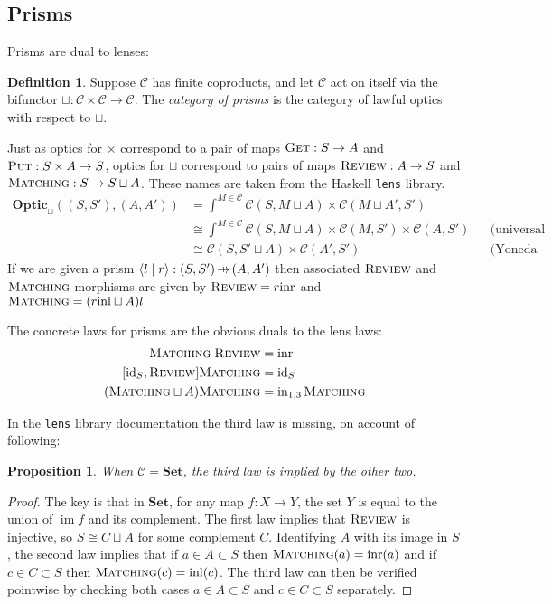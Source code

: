 \documentclass[11pt,letterpaper]{article}
\theoremstyle{plain}
\newtheorem{proposition}[theorem]{Proposition}
\theoremstyle{definition}
\newtheorem{definition}[theorem]{Definition}
\newcommand{\C}{\mathscr{C}}
\newcommand{\lenslib}{\texttt{lens}}
\newcommand{\Set}{\mathbf{Set}}
\newcommand{\Optic}{\mathbf{Optic}}
\newcommand{\id}{\mathrm{id}}
\newcommand{\inl}{\mathrm{inl}}
\newcommand{\inr}{\mathrm{inr}}
\DeclareMathOperator{\im}{im}
\newcommand{\rep}[2]{{\ensuremath \left\langle #1 \mid #2 \right\rangle}}
\newcommand{\fget}{\textsc{Get}}
\newcommand{\fput}{\textsc{Put}}
\newcommand{\freview}{\textsc{Review}}
\newcommand{\fmatching}{\textsc{Matching}}
\newcommand{\hto}{\ensuremath{\,\mathaccent\shortmid\rightarrow\,}}
\begin{document}
\subsection{Prisms}
Prisms are dual to lenses:

\begin{definition}
  Suppose $\C$ has finite coproducts, and let $\C$ act on itself via the bifunctor $\sqcup : \C \times \C \to \C$. The \emph{category of prisms} is the category of lawful optics with respect to $\sqcup$.
\end{definition}

Just as optics for $\times$ correspond to a pair of maps $\fget : S \to A$ and $\fput : S \times A \to S$, optics for $\sqcup$ correspond to pairs of maps $\freview : A \to S$ and $\fmatching : S \to S \sqcup A$. These names are taken from the Haskell \lenslib{} library.
\begin{align*}
  \Optic_\sqcup((S, S'), (A, A')) &= \int^{M \in \C} \C(S, M \sqcup A) \times \C(M \sqcup A', S') \\
                                  &\cong \int^{M \in \C} \C(S, M \sqcup A) \times \C(M, S') \times \C(A, S') && \text{(universal property of coproduct)} \\
                                  &\cong \C(S, S' \sqcup A) \times \C(A', S') && \text{(Yoneda reduction)}
\end{align*}
If we are given a prism $\rep{l}{r} : (S, S') \hto (A, A')$ then associated $\freview$ and $\fmatching$ morphisms are given by $\freview = r \inr$ and $\fmatching = (r\inl \sqcup A)l$

The concrete laws for prisms are the obvious duals to the lens laws:
\begin{align*}
  \fmatching \; \freview &= \inr \\
  [\id_S, \freview] \fmatching &= \id_S \\
  (\fmatching \sqcup A) \fmatching &= \mathrm{in}_{1,3} \, \fmatching
\end{align*}

In the \lenslib{} library documentation the third law is missing, on account of following:

\begin{proposition}
  When $\C = \Set$, the third law is implied by the other two.
\end{proposition}
\begin{proof}
  The key is that in $\Set$, for any map $f : X \to Y$, the set $Y$ is equal to the union of $\im f$ and its complement. The first law implies that $\freview$ is injective, so $S \cong C \sqcup A$ for some complement $C$. Identifying $A$ with its image in $S$, the second law implies that if $a\in A \subset S$ then $\fmatching(a) = \inr(a)$ and if $c\in C \subset S$ then $\fmatching(c) = \inl(c)$. The third law can then be verified pointwise by checking both cases $a\in A \subset S$ and $c\in C \subset S$ separately.
\end{proof}
\end{document}
